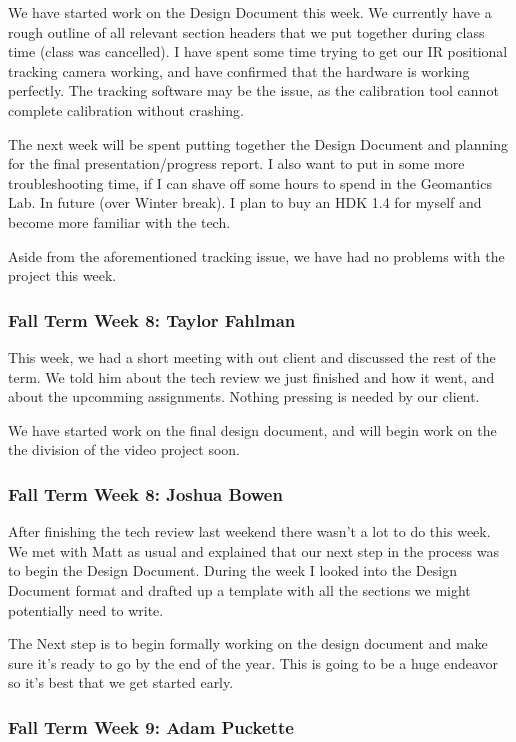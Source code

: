 \documentclass[draftclsnofoot,onecolumn]{IEEEtran}
\begin{document}
We have started work on the Design Document this week. We currently have a rough outline of all relevant section headers that we put together during class time (class was cancelled). I have spent some time trying to get our IR positional tracking camera working, and have confirmed that the hardware is working perfectly. The tracking software may be the issue, as the calibration tool cannot complete calibration without crashing.

The next week will be spent putting together the Design Document and planning for the final presentation/progress report. I also want to put in some more troubleshooting time, if I can shave off some hours to spend in the Geomantics Lab. In future (over Winter break). I plan to buy an HDK 1.4 for myself and become more familiar with the tech.

Aside from the aforementioned tracking issue, we have had no problems with the project this week.

\subsubsection{Fall Term Week 8: Taylor Fahlman}

This week, we had a short meeting with out client and discussed the rest of the term. We told him about the tech review we just finished and how it went, and about the upcomming assignments. Nothing pressing is needed by our client.

We have started work on the final design document, and will begin work on the the division of the video project soon.

\subsubsection{Fall Term Week 8: Joshua Bowen}

After finishing the tech review last weekend there wasn't a lot to do this week. We met with Matt as usual and explained that our next step in the process was to begin the Design Document. During the week I looked into the Design Document format and drafted up a template with all the sections we might potentially need to write.

The Next step is to begin formally working on the design document and make sure it's ready to go by the end of the year. This is going to be a huge endeavor so it's best that we get started early.

\subsubsection{Fall Term Week 9: Adam Puckette}
\end{document}
